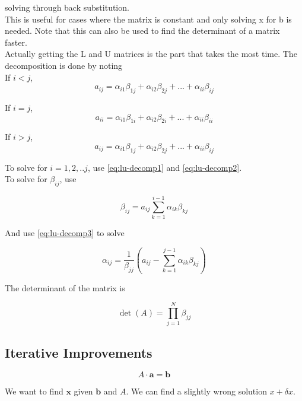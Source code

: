 \documentclass[]{article}
\begin{document}
solving through back substitution.\\

This is useful for cases where the matrix is constant and only solving x for b is needed. Note that this can also be used to find the determinant of a matrix faster.\\

Actually getting the L and U matrices is the part that takes the most time. The decomposition is done by noting\\

If $i<j$,
\begin{equation}\label{eq:lu-decomp1}
	a_{ij} = \alpha_{i1} \beta_{1j} + \alpha_{i2}\beta_{2j} + ... + \alpha_{ii}\beta_{ij}
\end{equation}\bigbreak

If $i=j$,
\begin{equation}\label{eq:lu-decomp2}
	a_{ii} = \alpha_{i1} \beta_{1i} + \alpha_{i2}\beta_{2i} + ... + \alpha_{ii}\beta_{ii}
\end{equation}\bigbreak

If $i>j$,
\begin{equation}\label{eq:lu-decomp3}
	a_{ij} = \alpha_{i1} \beta_{1j} + \alpha_{i2}\beta_{2j} + ... + \alpha_{ii}\beta_{ij}
\end{equation}\bigbreak


To solve for $i = 1, 2, .. j$, use \ref{eq:lu-decomp1} and \ref{eq:lu-decomp2}.\\

To solve for $\beta_{ij}$, use

\[\beta_{ij} = a_{ij}\sum_{k=1}^{i-1} \alpha_{ik}\beta_{kj}\]

And use \ref{eq:lu-decomp3} to solve 

\[\alpha_{ij} = \frac{1}{\beta_{jj}}\left(a_{ij} - \sum_{k=1}^{j-1}\alpha_{ik}\beta_{kj}\right)\]

The determinant of the matrix is 

\[\det(A) = \prod_{j=1}^N\beta_{jj}\]

\subsection{Iterative Improvements}\bigbreak

\[A\cdot\bm{a} = \bm{b}\]

We want to find $\bm{x}$ given $\bm{b}$ and $A$. We can find a slightly wrong solution $x + \delta x$.\\
\end{document}
